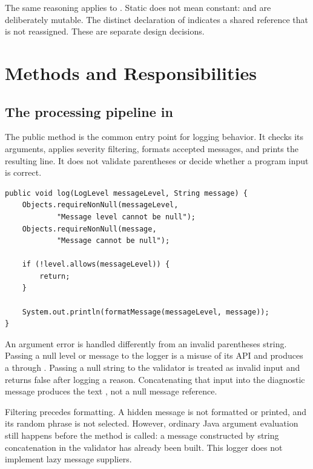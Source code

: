 The same reasoning applies to . Static does not mean constant:  and  are deliberately mutable. The distinct  declaration of  indicates a shared reference that is not reassigned. These are separate design decisions.

\section{Methods and Responsibilities}
\subsection{The processing pipeline in }
The public  method is the common entry point for logging behavior. It checks its arguments, applies severity filtering, formats accepted messages, and prints the resulting line. It does not validate parentheses or decide whether a program input is correct.

\begin{samepage}
\begin{lstlisting}
public void log(LogLevel messageLevel, String message) {
    Objects.requireNonNull(messageLevel,
            "Message level cannot be null");
    Objects.requireNonNull(message,
            "Message cannot be null");

    if (!level.allows(messageLevel)) {
        return;
    }

    System.out.println(formatMessage(messageLevel, message));
}
\end{lstlisting}
\end{samepage}

An argument error is handled differently from an invalid parentheses string. Passing a null level or message to the logger is a misuse of its API and produces a  through . Passing a null string to the validator is treated as invalid input and returns false after logging a reason. Concatenating that input into the diagnostic message produces the text , not a null message reference.

Filtering precedes formatting. A hidden message is not formatted or printed, and its random phrase is not selected. However, ordinary Java argument evaluation still happens before the method is called: a message constructed by string concatenation in the validator has already been built. This logger does not implement lazy message suppliers.

